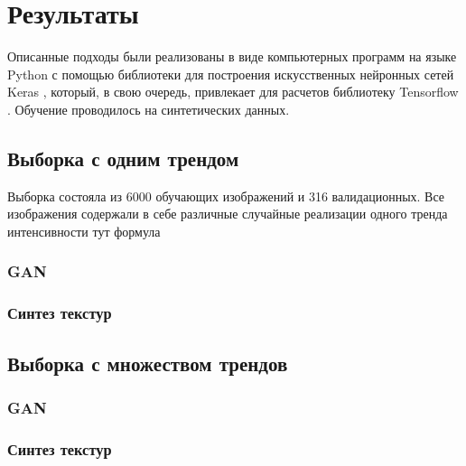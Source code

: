 \section{Результаты}
	Описанные подходы были реализованы в виде компьютерных программ на языке Python с помощью библиотеки для построения искусственных нейронных сетей Keras \cite{keras}, который, в свою очередь, привлекает для расчетов библиотеку Tensorflow \cite{tf}. Обучение проводилось на синтетических данных. 
	\subsection{Выборка с одним трендом}
		Выборка состояла из 6000 обучающих изображений и 316 валидационных. Все изображения содержали в себе различные случайные реализации одного тренда интенсивности
		тут формула
		\subsubsection{GAN}
		\subsubsection{Синтез текстур}
	\subsection{Выборка с множеством трендов}
		\subsubsection{GAN}
		\subsubsection{Синтез текстур}